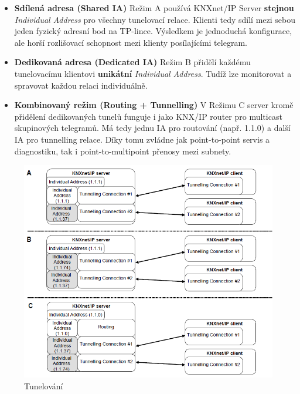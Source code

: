 \begin{itemize}
  \item \textbf{Sdílená adresa (Shared IA)}  
    \newline Režim A používá KNXnet/IP Server \textbf{stejnou} \textit{Individual Address} pro všechny tunelovací relace. Klienti tedy sdílí mezi sebou jeden fyzický adresní bod na TP-lince. Výsledkem je jednoduchá konfigurace, ale horší rozlišovací schopnost mezi klienty posílajícími telegram.
  \item \textbf{Dedikovaná adresa (Dedicated IA)}  
    \newline Režim B přidělí každému tunelovacímu klientovi \textbf{unikátní} \textit{Individual Address}. Tudíž lze monitorovat a spravovat každou relaci individuálně.

  \item \textbf{Kombinovaný režim (Routing + Tunnelling)}  
    \newline V Režimu C server kromě přidělení dedikovaných tunelů funguje i jako KNX/IP router pro multicast skupinových telegramů. Má tedy jednu IA pro routování (např. 1.1.0) a další IA pro tunnelling relace. Díky tomu zvládne jak point-to-point servis a diagnostiku, tak i point-to-multipoint přenosy mezi subnety. \newline
\end{itemize}
\begin{figure}[!h]
  \begin{center}
    \includegraphics[scale=0.6]{obrazky/KNX_Tunelling.png}
  \end{center}
  \caption[Tunelování \cite{KNXTunnel}]{Tunelování \cite{KNXTunnel}}
  \label{fig:Tunelovani}
\end{figure}
